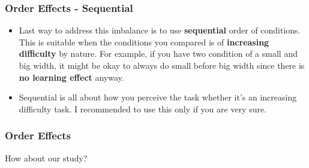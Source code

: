 \documentclass{beamer}
\begin{document}
\begin{frame}
\frametitle{Order Effects - Sequential}
\begin{itemize}
\item Last way to address this imbalance is to use \textbf{sequential} order of conditions.  This is suitable when the conditions you compared is of \textbf{increasing difficulty} by nature.   For example, if you have two condition of a small and big width, it might be okay to always do small before big width since there is \textbf{no learning effect} anyway.  %
\item Sequential is all about how you perceive the task whether it's an increasing difficulty task.  I recommended to use this only if you are very sure.  %
\end{itemize}
\end{frame}

\begin{frame}
	\frametitle{Order Effects}
	How about our study?
\end{frame}
\end{document}
